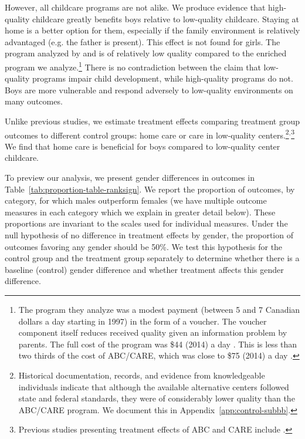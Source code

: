 However, all childcare programs are not alike. We produce evidence that high-quality childcare greatly benefits boys relative to low-quality childcare. Staying at home is a better option for them, especially if the family environment is relatively advantaged (e.g. the father is present). This effect is not found for girls. The program analyzed by \citet{Baker_Gruber_Milligan_2015_Noncog_Defects} and \citet{Kottelenberg-Lehrer_2014_Gender-Effects} is of relatively low quality compared to the enriched program we analyze.\footnote{The program they analyze was a modest payment (between 5 and 7 Canadian dollars a day starting in 1997) in the form of a voucher. The voucher component itself reduces received quality given an information problem by parents. The full cost of the program was \$44 (2014) a day \citep{Baker_etal_2005_Universal_Childcare_NBER}. This is less than two thirds of the cost of ABC/CARE, which was close to \$75 (2014) a day \citep{Garcia_Heckman_Leaf_etal_2017_Comp_CBA_Unpublished}.} There is no contradiction between the claim that low-quality programs impair child development, while high-quality programs do not. Boys are more vulnerable and respond adversely to low-quality environments on many outcomes.

Unlike previous studies, we estimate treatment effects comparing treatment group outcomes to different control groups: home care or care in low-quality centers.\footnote{Historical documentation, records, and evidence from knowledgeable individuals indicate that although the available alternative centers followed state and federal standards, they were of considerably lower quality than the ABC/CARE program. We document this in Appendix~\ref{app:control-subbb}.}$^,$\footnote{Previous studies presenting treatment effects of ABC and CARE include \citet{Ramey_etal_1985_Project-CARE_TiECSE,Clarke_Campbell_1998_ABC_Comparison_ECRQ,Campbell_Pungello_etal_2001_DP,Campbell_Ramey_etal_2002_ADS,Campbell_Wasik_etal_2008_ECRQ,Campbell_Conti_etal_2014_EarlyChildhoodInvestments}.} We find that home care is beneficial for boys compared to low-quality center childcare.

To preview our analysis, we present gender differences in outcomes in Table~\ref{tab:proportion-table-ranksign}. We report the proportion of outcomes, by category, for which males outperform females (we have multiple outcome measures in each category which we explain in greater detail below). These proportions are invariant to the scales used for individual measures. Under the null hypothesis of no difference in treatment effects by gender, the proportion of outcomes favoring any gender should be 50\%. We test this hypothesis for the control group and the treatment group separately to determine whether there is a baseline (control) gender difference and whether treatment affects this gender difference.

